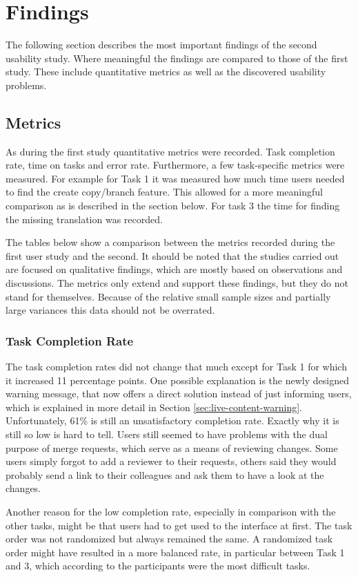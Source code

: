 \section{Findings}
The following section describes the most important findings of the second usability study. Where meaningful the findings are compared to those of the first study. These include quantitative metrics as well as the discovered usability problems.

\subsection{Metrics}
As during the first study quantitative metrics were recorded. Task completion rate, time on tasks and error rate. Furthermore, a few task-specific metrics were measured. For example for Task 1 it was measured how much time users needed to find the create copy/branch feature. This allowed for a more meaningful comparison as is described in the section below. For task 3 the time for finding the missing translation was recorded.

The tables below show a comparison between the metrics recorded during the first user study and the second. It should be noted that the studies carried out are focused on qualitative findings, which are mostly based on observations and discussions. The metrics only extend and support these findings, but they do not stand for themselves. Because of the relative small sample sizes and partially large variances this data should not be overrated.

\subsubsection{Task Completion Rate}
The task completion rates did not change that much except for Task 1 for which it increased 11 percentage points. One possible explanation is the newly designed warning message, that now offers a direct solution instead of just informing users, which is explained in more detail in Section \ref{sec:live-content-warning}. Unfortunately, 61\% is still an unsatisfactory completion rate. Exactly why it is still so low is hard to tell. Users still seemed to have problems with the dual purpose of merge requests, which serve as a means of reviewing changes. Some users simply forgot to add a reviewer to their requests, others said they would probably send a link to their colleagues and ask them to have a look at the changes.

Another reason for the low completion rate, especially in comparison with the other tasks, might be that users had to get used to the interface at first. The task order was not randomized but always remained the same. A randomized task order might have resulted in a more balanced rate, in particular between Task 1 and 3, which according to the participants were the most difficult tasks.

